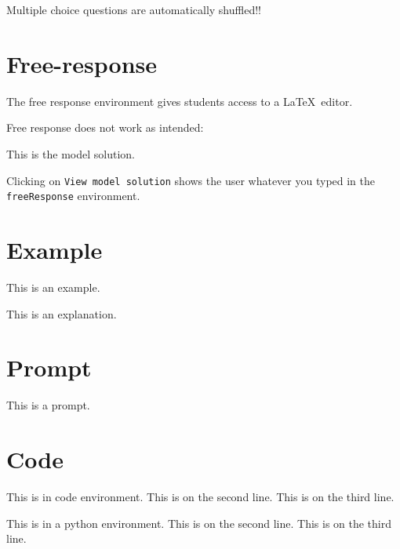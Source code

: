 \documentclass{ximera}
\begin{document}
\begin{remark}
  Multiple choice questions are automatically shuffled!!
\end{remark}



\section{Free-response}

The free response environment gives students access to a \LaTeX\ editor. 

Free response does not work as intended:

\begin{freeResponse}
  This is the model solution.
\end{freeResponse}

\begin{remark}
Clicking on \verb!View model solution! shows the user
whatever you typed in the  \verb!freeResponse! environment.
\end{remark}

\section{Example}

\begin{example}
This is an example.
\end{example}
\begin{explanation}
This is an explanation.
\end{explanation}

\section{Prompt}

\begin{prompt}
This is a prompt.
\end{prompt}

\section{Code}

\begin{code}
This is in code environment.
This is on the second line.
This is on the third line.
\end{code}

\begin{python}
This is in a python environment.
This is on the second line.
This is on the third line.
\end{python}
\end{document}
